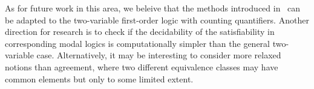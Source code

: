 As for future work in this area, we beleive that the methods introduced
in~ can be adapted to the two-variable first-order logic with
counting quantifiers.
Another direction for research is to check if the decidability of the
satisfiability in corresponding modal logics is computationally simpler than the
general two-variable case.
Alternatively, it may be interesting to consider more relaxed notions than
agreement, where two different equivalence classes may have common elements but
only to some limited extent.
